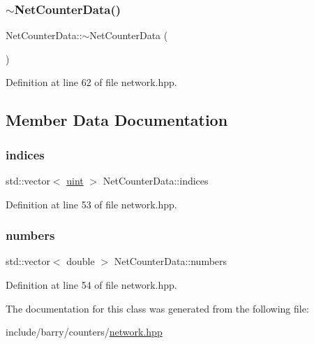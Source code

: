 \mbox{\label{class_net_counter_data_a2e88fcc7f0296d791fe9f0facd24489f}} 
\subsubsection{\texorpdfstring{$\sim$\+Net\+Counter\+Data()}{~NetCounterData()}}
{\footnotesize\ttfamily Net\+Counter\+Data\+::$\sim$\+Net\+Counter\+Data (\begin{DoxyParamCaption}{ }\end{DoxyParamCaption})\hspace{0.3cm}{\ttfamily [inline]}}



Definition at line 62 of file network.\+hpp.



\subsection{Member Data Documentation}
\mbox{\label{class_net_counter_data_ae2f47af99f3fa785d3faac089ab90d83}} 
\subsubsection{\texorpdfstring{indices}{indices}}
{\footnotesize\ttfamily std\+::vector$<$ \hyperlink{typedefs_8hpp_a91ad9478d81a7aaf2593e8d9c3d06a14}{uint} $>$ Net\+Counter\+Data\+::indices}



Definition at line 53 of file network.\+hpp.

\mbox{\label{class_net_counter_data_ad218e01cd14fb4abfbe21d8d92a6cbd3}} 
\subsubsection{\texorpdfstring{numbers}{numbers}}
{\footnotesize\ttfamily std\+::vector$<$ double $>$ Net\+Counter\+Data\+::numbers}



Definition at line 54 of file network.\+hpp.



The documentation for this class was generated from the following file\+:\begin{DoxyCompactItemize}
\item 
include/barry/counters/\hyperlink{network_8hpp}{network.\+hpp}\end{DoxyCompactItemize}
